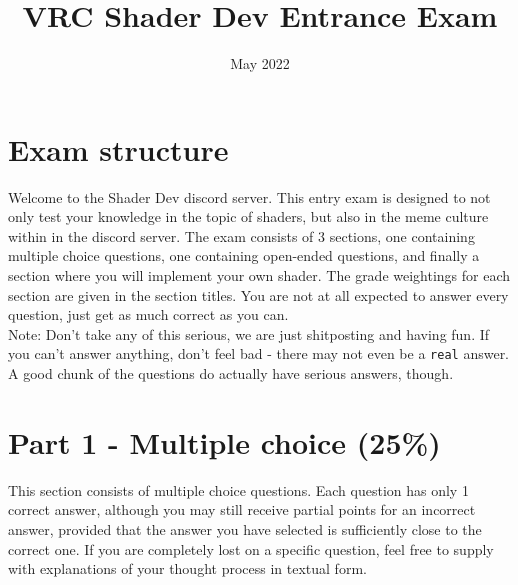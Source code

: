 \documentclass{exam}
\title{VRC Shader Dev Entrance Exam}
\date{May 2022}
\begin{document}
\maketitle

\section*{Exam structure}
Welcome to the Shader Dev discord server. This entry exam is designed to not only test your knowledge in the topic of shaders, but also in the meme culture within in the discord server. The exam consists of 3 sections, one containing multiple choice questions, one containing open-ended questions, and finally a section where you will implement your own shader. The grade weightings for each section are given in the section titles. You are not at all expected to answer every question, just get as much correct as you can.\\

Note: Don't take any of this serious, we are just shitposting and having fun. If you can't answer anything, don't feel bad - there may not even be a \texttt{real} answer. A good chunk of the questions do actually have serious answers, though.

\section*{Part 1 - Multiple choice (25\%)}
This section consists of multiple choice questions. Each question has only 1 correct answer, although you may still receive partial points for an incorrect answer, provided that the answer you have selected is sufficiently close to the correct one. If you are completely lost on a specific question, feel free to supply with explanations of your thought process in textual form.
\end{document}
